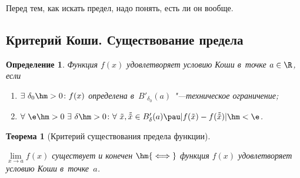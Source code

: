 \documentclass[a4paper,10pt,twoside]{article}
\newtheorem{Def}{Определение}[section]
\newtheorem{The}{Теорема}[section]
\begin{document}
Перед тем, как искать предел, надо понять, есть ли он вообще.

\subsection{Критерий Коши. Существование предела}
\begin{Def}
    Функция $f(x)$ удовлетворяет условию Коши в~точке $a\in\R$, если

    \begin{enumerate}
        \item $\exists\  \delta_0\hm>0\colon f(x)$ определена в~$B'_{\delta_0}(a)$ "---техническое ограничение;

        \item $\forall\ \e\hm>0\ \exists\ \delta\hm>0\colon\forall\  \tilde{x},\tilde{\tilde {x}}\in B'_\delta(a)\pau |f(\tilde x)-f(\tilde{\tilde x})|\hm<\e$.
    \end{enumerate}
\end{Def}

\begin{The}[Критерий существования предела функции] \label{KKoshi}
    

    $\lim\limits_{x\to a} f(x)$ существует и конечен $\hm{\iff}$ функция $f(x)$ удовлетворяет условию Коши в~точке~$a$.
\end{The}
\end{document}
